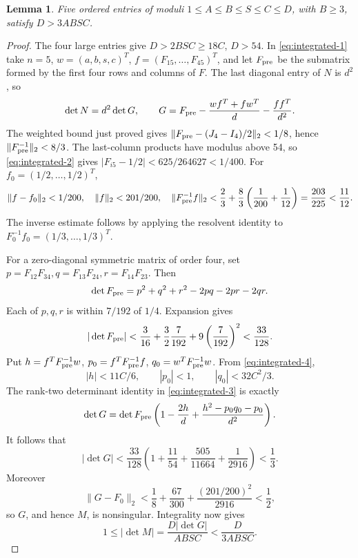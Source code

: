 \documentclass[12pt]{article}
\newtheorem{lemma}[theorem]{Lemma}
\numberwithin{equation}{section}
\begin{document}
\begin{lemma}\label{lem:product-five}
Five ordered entries of moduli \(1\le A\le B\le S\le C\le D\),
with \(B\ge3\), satisfy \(D>3ABSC\).
\end{lemma}
\begin{proof}
The four large entries give \(D>2BSC\ge18C\), \(D>54\).
In \eqref{eq:integrated-1} take \(n=5\), \(w=(a,b,s,c)^T\),
\(f=(F_{15},\ldots,F_{45})^T\), and let \(F_{\rm pre}\) be the
submatrix formed by the first four rows and columns of \(F\). The last diagonal entry of \(N\) is \(d^2\), so
\begin{equation}\label{eq:integrated-3}
\det N=d^2\det G,\qquad
 G=F_{\rm pre}-\frac{wf^T+fw^T}{d}-\frac{ff^T}{d^2}.
\end{equation}
The weighted bound just proved gives
\(\|F_{\rm pre}-(J_4-I_4)/2\|_2<1/8\), hence
\(\|F_{\rm pre}^{-1}\|_2<8/3\). The last-column products have
modulus above 54, so \eqref{eq:integrated-2} gives
\(|F_{i5}-1/2|<625/264627<1/400\).
For \(f_0=(1/2,\ldots,1/2)^T\),
\begin{equation}\label{eq:integrated-4}
\|f-f_0\|_2<1/200,\quad \|f\|_2<201/200,\quad
 \|F_{\rm pre}^{-1}f\|_2
 <\frac23+\frac83\left(\frac1{200}+\frac1{12}\right)
 =\frac{203}{225}<\frac{11}{12}.
\end{equation}
The inverse estimate follows by applying the resolvent identity to
\(F_0^{-1}f_0=(1/3,\ldots,1/3)^T\).

For a zero-diagonal symmetric matrix of order four, set
\(p=F_{12}F_{34},q=F_{13}F_{24},r=F_{14}F_{23}\). Then
\[
 \det F_{\rm pre}=p^2+q^2+r^2-2pq-2pr-2qr.
\]
Each of \(p,q,r\) is within \(7/192\) of \(1/4\). Expansion gives
\[
 |\det F_{\rm pre}|<
 \frac3{16}+\frac32\frac7{192}+9\left(\frac7{192}\right)^2
 <\frac{33}{128}.
\]
Put \(h=f^TF_{\rm pre}^{-1}w\), \(p_0=f^TF_{\rm pre}^{-1}f\),
\(q_0=w^TF_{\rm pre}^{-1}w\). From \eqref{eq:integrated-4},
\[
 |h|<11C/6,\qquad |p_0|<1,\qquad |q_0|<32C^2/3.
\]
The rank-two determinant identity in \eqref{eq:integrated-3} is exactly
\[
 \det G=\det F_{\rm pre}
 \left(1-\frac{2h}{d}+\frac{h^2-p_0q_0-p_0}{d^2}\right).
\]
It follows that
\[
 |\det G|<
 \frac{33}{128}\left(1+\frac{11}{54}+\frac{505}{11664}
                              +\frac1{2916}\right)<\frac13.
\]
Moreover
\[
 \|G-F_0\|_2<
 \frac18+\frac{67}{300}+\frac{(201/200)^2}{2916}<\frac12,
\]
so \(G\), and hence \(M\), is nonsingular. Integrality now gives
\[
 1\le|\det M|=\frac{D|\det G|}{ABSC}<\frac{D}{3ABSC}.
\]
\end{proof}
\end{document}
